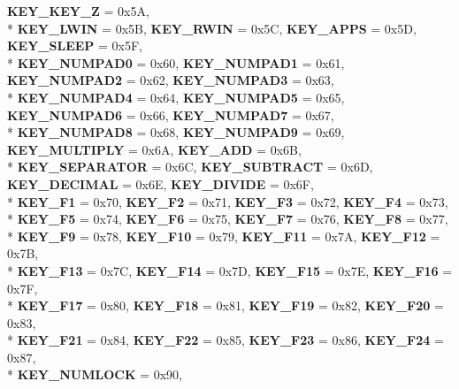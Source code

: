 \begin{DoxyCompactItemize}
{\bfseries K\+E\+Y\+\_\+\+K\+E\+Y\+\_\+Z} = 0x5A, 
\\*
{\bfseries K\+E\+Y\+\_\+\+L\+W\+IN} = 0x5B, 
{\bfseries K\+E\+Y\+\_\+\+R\+W\+IN} = 0x5C, 
{\bfseries K\+E\+Y\+\_\+\+A\+P\+PS} = 0x5D, 
{\bfseries K\+E\+Y\+\_\+\+S\+L\+E\+EP} = 0x5F, 
\\*
{\bfseries K\+E\+Y\+\_\+\+N\+U\+M\+P\+A\+D0} = 0x60, 
{\bfseries K\+E\+Y\+\_\+\+N\+U\+M\+P\+A\+D1} = 0x61, 
{\bfseries K\+E\+Y\+\_\+\+N\+U\+M\+P\+A\+D2} = 0x62, 
{\bfseries K\+E\+Y\+\_\+\+N\+U\+M\+P\+A\+D3} = 0x63, 
\\*
{\bfseries K\+E\+Y\+\_\+\+N\+U\+M\+P\+A\+D4} = 0x64, 
{\bfseries K\+E\+Y\+\_\+\+N\+U\+M\+P\+A\+D5} = 0x65, 
{\bfseries K\+E\+Y\+\_\+\+N\+U\+M\+P\+A\+D6} = 0x66, 
{\bfseries K\+E\+Y\+\_\+\+N\+U\+M\+P\+A\+D7} = 0x67, 
\\*
{\bfseries K\+E\+Y\+\_\+\+N\+U\+M\+P\+A\+D8} = 0x68, 
{\bfseries K\+E\+Y\+\_\+\+N\+U\+M\+P\+A\+D9} = 0x69, 
{\bfseries K\+E\+Y\+\_\+\+M\+U\+L\+T\+I\+P\+LY} = 0x6A, 
{\bfseries K\+E\+Y\+\_\+\+A\+DD} = 0x6B, 
\\*
{\bfseries K\+E\+Y\+\_\+\+S\+E\+P\+A\+R\+A\+T\+OR} = 0x6C, 
{\bfseries K\+E\+Y\+\_\+\+S\+U\+B\+T\+R\+A\+CT} = 0x6D, 
{\bfseries K\+E\+Y\+\_\+\+D\+E\+C\+I\+M\+AL} = 0x6E, 
{\bfseries K\+E\+Y\+\_\+\+D\+I\+V\+I\+DE} = 0x6F, 
\\*
{\bfseries K\+E\+Y\+\_\+\+F1} = 0x70, 
{\bfseries K\+E\+Y\+\_\+\+F2} = 0x71, 
{\bfseries K\+E\+Y\+\_\+\+F3} = 0x72, 
{\bfseries K\+E\+Y\+\_\+\+F4} = 0x73, 
\\*
{\bfseries K\+E\+Y\+\_\+\+F5} = 0x74, 
{\bfseries K\+E\+Y\+\_\+\+F6} = 0x75, 
{\bfseries K\+E\+Y\+\_\+\+F7} = 0x76, 
{\bfseries K\+E\+Y\+\_\+\+F8} = 0x77, 
\\*
{\bfseries K\+E\+Y\+\_\+\+F9} = 0x78, 
{\bfseries K\+E\+Y\+\_\+\+F10} = 0x79, 
{\bfseries K\+E\+Y\+\_\+\+F11} = 0x7A, 
{\bfseries K\+E\+Y\+\_\+\+F12} = 0x7B, 
\\*
{\bfseries K\+E\+Y\+\_\+\+F13} = 0x7C, 
{\bfseries K\+E\+Y\+\_\+\+F14} = 0x7D, 
{\bfseries K\+E\+Y\+\_\+\+F15} = 0x7E, 
{\bfseries K\+E\+Y\+\_\+\+F16} = 0x7F, 
\\*
{\bfseries K\+E\+Y\+\_\+\+F17} = 0x80, 
{\bfseries K\+E\+Y\+\_\+\+F18} = 0x81, 
{\bfseries K\+E\+Y\+\_\+\+F19} = 0x82, 
{\bfseries K\+E\+Y\+\_\+\+F20} = 0x83, 
\\*
{\bfseries K\+E\+Y\+\_\+\+F21} = 0x84, 
{\bfseries K\+E\+Y\+\_\+\+F22} = 0x85, 
{\bfseries K\+E\+Y\+\_\+\+F23} = 0x86, 
{\bfseries K\+E\+Y\+\_\+\+F24} = 0x87, 
\\*
{\bfseries K\+E\+Y\+\_\+\+N\+U\+M\+L\+O\+CK} = 0x90, 

\end{DoxyCompactItemize}
